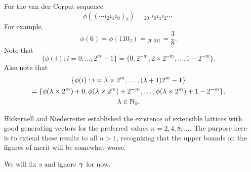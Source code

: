 \documentclass{amsart}
\begin{document}
For the van der Corput sequence
\[
\phi((\cdots i_2 i_1 i_0)_2) = {}_20.i_0 i_1 i_2 \cdots.
\]
For example,
\[
\phi(6) = \phi(110_2) = {}_20.011 = \frac 38.
\]
Note that
\begin{equation} \label{eq:phipropone}
\{ \phi(i) : i = 0, \ldots, 2^m-1 \} = \{0, 2^{-m}, 2\times 2^{-m}, \ldots, 1 - 2^{-m} \}.
\end{equation}
Also note that
\begin{multline} \label{eq:phiproptwo}
\{ \phi(i) : i = \lambda \times 2^m , \ldots, (\lambda+1)2^m-1 \} \\
= \{\phi(\lambda \times 2^m) + 0, \phi(\lambda \times 2^m) + 2^{-m}, \ldots, \phi(\lambda \times 2^m) + 1 - 2^{-m} \} , \\
\lambda \in \mathbb{N}_{0}.
\end{multline}


Hickernell and Niederreiter \cite{HicNie03a} established the existence of extensible lattices with good generating vectors for the preferred values $n = 2, 4, 8, \ldots$.  The purpose here is to extend these results to all $n>1$, recognizing that the upper bounds on the figures of merit will be somewhat worse.

We will fix $s$ and ignore $\boldsymbol{\gamma}$ for now.
\end{document}
